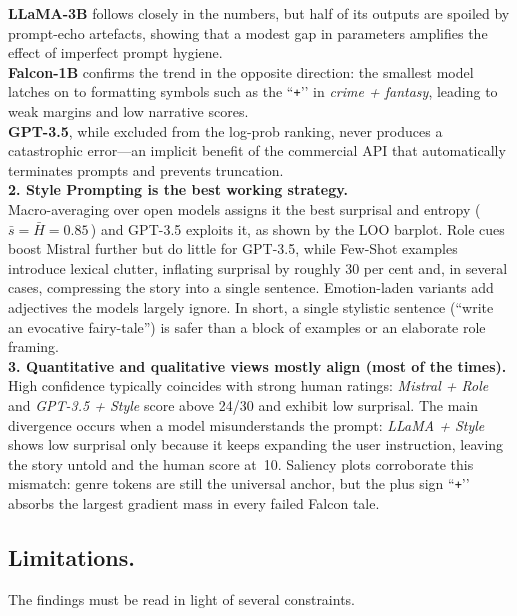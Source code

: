 \documentclass[12pt]{article}
\begin{document}
\noindent \textbf{LLaMA-3B} follows closely in the numbers, but half of its outputs are
spoiled by prompt-echo artefacts, showing that a modest gap in
parameters amplifies the effect of imperfect prompt hygiene. \\

\noindent \textbf{Falcon-1B} confirms the trend in the opposite direction: the smallest
model latches on to formatting symbols such as the ``\texttt{+}’’ in
\textit{crime + fantasy}, leading to weak margins and low narrative
scores. \\

\noindent \textbf{GPT-3.5}, while excluded from the log-prob ranking, never produces a
catastrophic error—an implicit benefit of the commercial API that
automatically terminates prompts and prevents truncation.\\

\textbf{2. Style Prompting is the best working strategy.} \\

Macro-averaging over open models assigns it the best surprisal and
entropy (\,$\bar s=\bar H=0.85$\,) and GPT-3.5 exploits it, as shown by the LOO barplot.
Role cues boost Mistral further but do little for GPT-3.5, while Few-Shot
examples introduce lexical clutter, inflating surprisal by roughly
30 per cent and, in several cases, compressing the story into a single
sentence.
Emotion-laden variants add adjectives the models largely ignore.
In short, a single stylistic sentence (“write an evocative fairy-tale”)
is safer than a block of examples or an elaborate role framing.\\

\textbf{3. Quantitative and qualitative views mostly align (most of the times).}\\

High confidence typically coincides with strong human ratings:  
\textit{Mistral + Role} and \textit{GPT-3.5 + Style} score above
24/30 and exhibit low surprisal.
The main divergence occurs when a model misunderstands the prompt:
\textit{LLaMA + Style} shows low surprisal only because it keeps
expanding the user instruction, leaving the story untold and the human
score at~10.  Saliency plots corroborate this mismatch: genre tokens are
still the universal anchor, but the plus sign “\texttt{+}’’ absorbs the
largest gradient mass in every failed Falcon tale.

\subsection{Limitations.}
The findings must be read in light of several constraints.  \\
\end{document}
